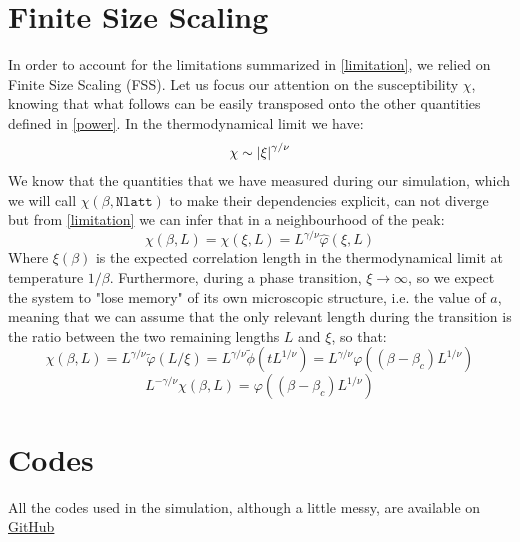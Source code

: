 \documentclass[11pt]{scrartcl} %
\begin{document}
\section{Finite Size Scaling}
In order to account for the limitations summarized in \eqref{limitation}, we relied on Finite Size Scaling (FSS). Let us focus our attention on the susceptibility $\chi$, knowing that what follows can be easily transposed onto the other quantities defined in \eqref{power}. In the thermodynamical limit we have:
\begin{equation}
\chi \sim \left\lvert \xi\right\rvert ^{\gamma / \nu}
\end{equation}
We know that the quantities that we have measured during our simulation, which we will call $\chi(\beta , \mathtt{Nlatt})$ to make their dependencies explicit, can not diverge but from \eqref{limitation} we can infer that in a neighbourhood of the peak:
\begin{equation}
\chi(\beta , L) = \chi(\xi , L) = L ^{\gamma / \nu} \hat{\varphi}(\xi,L)
\end{equation}
Where $\xi (\beta)$ is the expected correlation length in the thermodynamical limit at temperature $1/\beta$. Furthermore, during a phase transition, $\xi \rightarrow \infty$, so we expect the system to "lose memory" of its own microscopic structure, i.e. the value of $a$, meaning that we can assume that the only relevant length during the transition is the ratio between the two remaining lengths $L$ and $\xi$, so that:
\begin{equation}
\chi(\beta , L) = L ^{\gamma / \nu} \tilde{\varphi}(L/ \xi)= L ^{\gamma / \nu} \tilde{\phi}\left(tL^{1/\nu}\right) = L ^{\gamma / \nu} \varphi\left(\left(\beta - \beta _c\right) L^{1/\nu}\right)
\end{equation}
\begin{equation}
\label{fss_chi}
L ^{-\gamma / \nu}\chi(\beta , L) = \varphi\left(\left(\beta - \beta _c\right) L^{1/\nu}\right)
\end{equation}

\section{Codes}
\label{codes}
All the codes used in the simulation, although a little messy, are available on \href{https://github.com/mccc03/Modulo1}{GitHub} 
\end{document}
